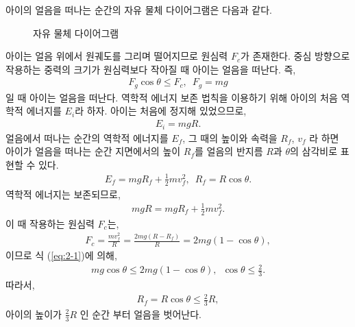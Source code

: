 \documentclass[floatfix,nofootinbib,superscriptaddress,fleqn]{revtex4-2}
\begin{document}
아이의 얼음을 떠나는 순간의 자유 물체 다이어그램은 다음과 같다.
\begin{figure}[htbp] 
  \centering
  \caption{자유 물체 다이어그램}
\end{figure}
아이는 얼음 위에서 원궤도를 그리며 떨어지므로 원심력 $F_c$가 존재한다. 
중심 방향으로 작용하는 중력의 크기가 원심력보다 작아질 때 아이는 얼음을 떠난다.
즉,
\begin{align}\label{eq:2-1}
  F_g\cos{\theta} \leq F_c,\,\,\,F_g = mg
\end{align}
일 때 아이는 얼음을 떠난다. 역학적 에너지 보존 법칙을 이용하기 위해 
아이의 처음 역학적 에너지를 $E_i$라 하자. 
아이는 처음에 정지해 있었으므로,
\begin{align}
  E_i = mgR.
\end{align}
얼음에서 떠나는 순간의 역학적 에너지를 $E_f$, 그 때의 높이와 속력을 
$R_f$, $v_f$ 라 하면 아이가 얼음을 떠나는 순간 지면에서의 높이 
$R_f$를 얼음의 반지름 $R$과 $\theta$의 삼각비로 표현할 수 있다.
\begin{align}
  E_f = mgR_f + \frac{1}{2}mv_f^2,\,\,\,R_f=R\cos{\theta}.
\end{align}
 역학적 에너지는 보존되므로,
\begin{align}
  mgR = mgR_f + \frac{1}{2}mv_f^2.
\end{align}
이 때 작용하는 원심력 $F_c$는,
\begin{align}
  F_c = \frac{mv_f^2}{R} = \frac{2mg(R-R_f)}{R}
  = 2mg\left(1-\cos{\theta}\right),
\end{align}
이므로 식 (\ref{eq:2-1})에 의해,
\begin{align}
  mg\cos{\theta} \leq 2mg\left(1-\cos{\theta}\right),\,\,\,
  \cos{\theta} \leq \frac{2}{3}.
\end{align}
따라서,
\begin{align}
  R_f = R\cos{\theta} \leq \frac{2}{3}R,
\end{align}
아이의 높이가 $\frac{2}{3}R$ 인 순간 부터 얼음을 벗어난다.
\end{document}
